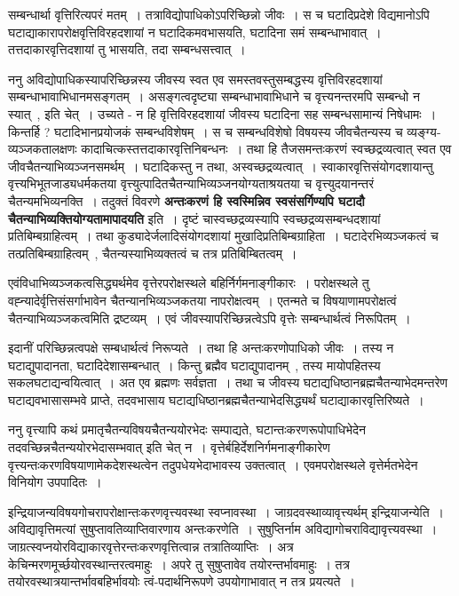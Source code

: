 	सम्बन्धार्था वृत्तिरित्यपरं मतम्~। तत्राविद्योपाधिकोऽपरिच्छिन्नो जीवः~। स च घटादिप्रदेशे विद्यमानोऽपि घटाद्याकारापरोक्षवृत्तिविरहदशायां न घटादिकमवभासयति, घटादिना समं सम्बन्धाभावात्~। तत्तदाकारवृत्तिदशायां तु भासयति, तदा सम्बन्धसत्त्वात्~।\par
	ननु अविद्योपाधिकस्यापरिच्छिन्नस्य जीवस्य स्वत एव समस्तवस्तुसम्बद्धस्य वृत्तिविरहदशायां सम्बन्धाभावाभिधानमसङ्गतम्~। असङ्गत्वदृष्ट्या सम्बन्धाभावाभिधाने च वृत्त्यनन्तरमपि सम्बन्धो न स्यात्~, इति चेत्~। उच्यते - न हि वृत्तिविरहदशायां जीवस्य घटादिना सह सम्बन्धसामान्यं निषेधामः~। किन्तर्हि ? घटादिभानप्रयोजकं सम्बन्धविशेषम्~। स च सम्बन्धविशेषो विषयस्य जीवचैतन्यस्य च व्यङ्ग्य-व्यञ्जकतालक्षणः कादाचित्कस्तत्तदाकारवृत्तिनिबन्धनः~। तथा हि तैजसमन्तःकरणं स्वच्छद्रव्यत्वात् स्वत एव जीवचैतन्याभिव्यञ्जनसमर्थम्~। घटादिकस्तु न तथा, अस्वच्छद्रव्यत्वात्~। स्वाकारवृत्तिसंयोगदशायान्तु वृत्त्यभिभूतजाड्यधर्मकतया वृत्त्युत्पादितचैतन्याभिव्यञ्जनयोग्यताश्रयतया च वृत्त्युदयानन्तरं चैतन्यमभिव्यनक्ति~। तदुक्तं विवरणे {\bfseries अन्तःकरणं हि स्वस्मिन्निव स्वसंसर्गिण्यपि घटादौ चैतन्याभिव्यक्तियोग्यतामापादयति} इति~। दृष्टं चास्वच्छद्रव्यस्यापि स्वच्छद्रव्यसम्बन्धदशायां प्रतिबिम्बग्राहित्वम्~। तथा कुड्यादेर्जलादिसंयोगदशायां मुखादिप्रतिबिम्बग्राहिता~। घटादेरभिव्यञ्जकत्वं च तत्प्रतिबिम्बग्राहित्वम्~, चैतन्यस्याभिव्यक्तत्वं च तत्र प्रतिबिम्बितत्वम्~।\par
	एवंविधाभिव्यञ्जकत्वसिद्ध्यर्थमेव वृत्तेरपरोक्षस्थले बहिर्निर्गमनाङ्गीकारः~। परोक्षस्थले तु वह्न्यादेर्वृत्तिसंसर्गाभावेन चैतन्यानभिव्यञ्जकतया नापरोक्षत्वम्~। एतन्मते च विषयाणामपरोक्षत्वं चैतन्याभिव्यञ्जकत्वमिति द्रष्टव्यम्~। एवं जीवस्यापरिच्छिन्नत्वेऽपि वृत्तेः सम्बन्धार्थत्वं निरूपितम्~।\par
	इदानीं परिच्छिन्नत्वपक्षे सम्बधार्थत्वं निरूप्यते~। तथा हि अन्तःकरणोपाधिको जीवः~। तस्य न घटाद्युपादानता, घटादिदेशासम्बन्धात्~। किन्तु ब्रह्मैव घटाद्युपादानम्~, तस्य मायोपहितस्य सकलघटाद्यन्वयित्वात्~। अत एव ब्रह्मणः सर्वज्ञता~। तथा च जीवस्य घटाद्यधिष्ठानब्रह्मचैतन्याभेदमन्तरेण घटाद्यवभासासम्भवे प्राप्ते, तदवभासाय घटाद्यधिष्ठानब्रह्मचैतन्याभेदसिद्ध्यर्थं घटाद्याकारवृत्तिरिष्यते~।\par
	ननु वृत्त्यापि कथं प्रमातृचैतन्यविषयचैतन्ययोरभेदः सम्पाद्यते, घटान्तःकरणरूपोपाधिभेदेन तदवच्छिन्नचैतन्ययोरभेदासम्भवात् इति चेत् न~। वृत्तेर्बहिर्देशनिर्गमनाङ्गीकारेण वृत्त्यन्तःकरणविषयाणामेकदेशस्थत्वेन तदुपधेयभेदाभावस्य उक्तत्वात्~। एवमपरोक्षस्थले वृत्तेर्मतभेदेन विनियोग उपपादितः~।\par
	इन्द्रियाजन्यविषयगोचरापरोक्षान्तःकरणवृत्त्यवस्था स्वप्नावस्था~। जाग्रदवस्थाव्यावृत्त्यर्थम् इन्द्रियाजन्येति~। अविद्यावृत्तिमत्यां सुषुप्तावतिव्याप्तिवारणाय अन्तःकरणेति~। सुषुप्तिर्नाम अविद्यागोचराविद्यावृत्त्यवस्था~। जाग्रत्स्वप्नयोरविद्याकारवृत्तेरन्तःकरणवृत्तित्वान्न तत्रातिव्याप्तिः~। अत्र केचिन्मरणमूर्च्छयोरवस्थान्तरत्वमाहुः~। अपरे तु सुषुप्तावेव तयोरन्तर्भावमाहुः~। तत्र तयोरवस्थात्रयान्तर्भावबहिर्भावयोः त्वं-पदार्थनिरूपणे उपयोगाभावात् न तत्र प्रयत्यते~।\par
